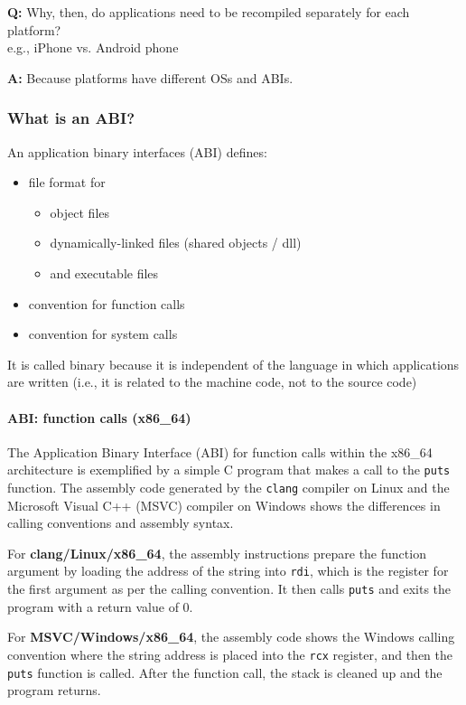 \documentclass[12pt]{article}
\begin{document}
\textbf{Q:} Why, then, do applications need to be recompiled separately for each platform?\\
e.g., iPhone vs. Android phone

\textbf{A:} Because platforms have different OSs and ABIs.
\subsubsection{What is an ABI?}

An application binary interfaces (ABI) defines:
\begin{itemize}
    \item file format for
    \begin{itemize}
        \item object files
        \item dynamically-linked files (shared objects / dll)
        \item and executable files
    \end{itemize}
    \item convention for function calls
    \item convention for system calls
\end{itemize}

It is called binary because it is independent of the language in which applications are written (i.e., it is related to the machine code, not to the source code)

\paragraph{ABI: function calls (x86\_64)}

The Application Binary Interface (ABI) for function calls within the x86\_64 architecture is exemplified by a simple C program that makes a call to the \texttt{puts} function. The assembly code generated by the \texttt{clang} compiler on Linux and the Microsoft Visual C++ (MSVC) compiler on Windows shows the differences in calling conventions and assembly syntax.

For \textbf{clang/Linux/x86\_64}, the assembly instructions prepare the function argument by loading the address of the string into \texttt{rdi}, which is the register for the first argument as per the calling convention. It then calls \texttt{puts} and exits the program with a return value of 0.

For \textbf{MSVC/Windows/x86\_64}, the assembly code shows the Windows calling convention where the string address is placed into the \texttt{rcx} register, and then the \texttt{puts} function is called. After the function call, the stack is cleaned up and the program returns.
\end{document}
